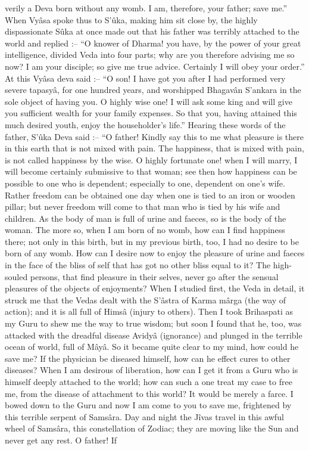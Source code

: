  

verily a Deva born without any womb. I am, therefore, your father; save me.” When Vyâsa spoke thus to S’ûka, making him sit close by, the highly dispassionate Sûka at once made out that his father was terribly attached to the world and replied :-- “O knower of Dharma! you have, by the power of your great intelligence, divided Veda into four parts; why are you therefore advising me so now? I am your disciple; so give me true advice. Certainly I will obey your order.” At this Vyâsa deva said :-- “O son! I have got you after I had performed very severe tapasyâ, for one hundred years, and worshipped Bhagavân S'ankara in the sole object of having you. O highly wise one! I will ask some king and will give you sufficient wealth for your family expenses. So that you, having attained this much desired youth, enjoy the householder's life.” Hearing these words of the father, S’ûka Deva said :-- “O father! Kindly say this to me what pleasure is there in this earth that is not mixed with pain. The happiness, that is mixed with pain, is not called happiness by the wise. O highly fortunate one! when I will marry, I will become certainly submissive to that woman; see then how happiness can be possible to one who is dependent; especially to one, dependent on one's wife. Rather freedom can be obtained one day when one is tied to an iron or wooden pillar; but never freedom will come to that man who is tied by his wife and children. As the body of man is full of urine and faeces, so is the body of the woman. The more so, when I am born of no womb, how can I find happiness there; not only in this birth, but in my previous birth, too, I had no desire to be born of any womb. How can I desire now to enjoy the pleasure of urine and faeces in the face of the bliss of self that has got no other bliss equal to it? The high-souled persons, that find pleasure in their selves, never go after the sensual pleasures of the objects of enjoyments? When I studied first, the Veda in detail, it struck me that the Vedas dealt with the S'âstra of Karma mârga (the way of action); and it is all full of Himsâ (injury to others). Then I took Brihaspati as my Guru to shew me the way to true wisdom; but soon I found that he, too, was attacked with the dreadful disease Avidyâ (ignorance) and plunged in the terrible ocean of world, full of Mâyâ. So it became quite clear to my mind, how could he save me? If the physician be diseased himself, how can he effect cures to other diseases? When I am desirous of liberation, how can I get it from a Guru who is himself deeply attached to the world; how can such a one treat my case to free me, from the disease of attachment to this world? It would be merely a farce. I bowed down to the Guru and now I am come to you to save me, frightened by this terrible serpent of Samsâra. Day and night the Jîvas travel in this awful wheel of Samsâra, this constellation of Zodiac; they are moving like the Sun and never get any rest. O father! If

